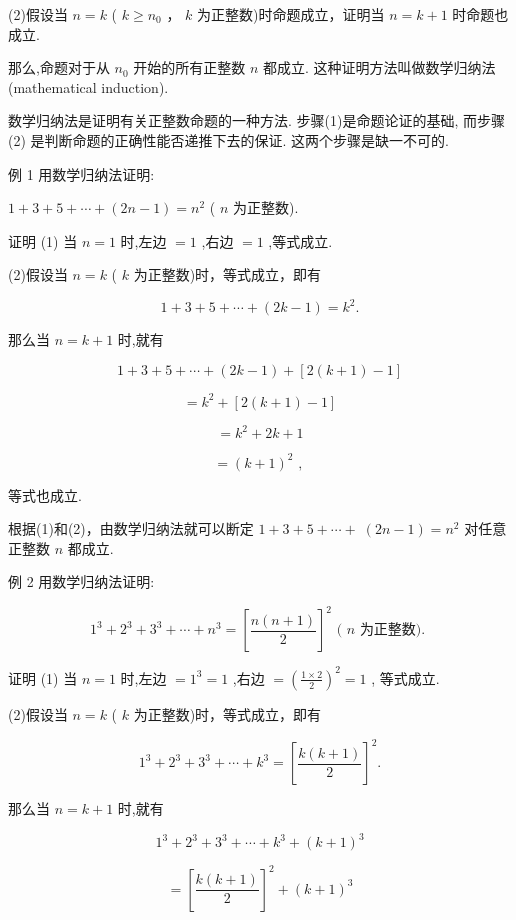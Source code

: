 \documentclass[10pt]{article}
\begin{document}
(2)假设当 \(n = k\) ( \(k \geq  {n}_{0}\) ， \(k\) 为正整数)时命题成立，证明当 \(n = k + 1\) 时命题也成立.

那么,命题对于从 \({n}_{0}\) 开始的所有正整数 \(n\) 都成立. 这种证明方法叫做数学归纳法 (mathematical induction).

数学归纳法是证明有关正整数命题的一种方法. 步骤(1)是命题论证的基础, 而步骤 (2) 是判断命题的正确性能否递推下去的保证. 这两个步骤是缺一不可的.

例 1 用数学归纳法证明:

\(1 + 3 + 5 + \cdots  + \left( {{2n} - 1}\right)  = {n}^{2}\) ( \(n\) 为正整数).

证明 (1) 当 \(n = 1\) 时,左边 \(= 1\) ,右边 \(= 1\) ,等式成立.

(2)假设当 \(n = k\) ( \(k\) 为正整数)时，等式成立，即有

\[
1 + 3 + 5 + \cdots  + \left( {{2k} - 1}\right)  = {k}^{2}.
\]

那么当 \(n = k + 1\) 时,就有

\[
1 + 3 + 5 + \cdots  + \left( {{2k} - 1}\right)  + \left\lbrack  {2\left( {k + 1}\right)  - 1}\right\rbrack
\]

\[
= {k}^{2} + \left\lbrack  {2\left( {k + 1}\right)  - 1}\right\rbrack
\]

\[
= {k}^{2} + {2k} + 1
\]

\[
= {\left( k + 1\right) }^{2}\text{ , }
\]

等式也成立.

根据(1)和(2)，由数学归纳法就可以断定 \(1 + 3 + 5 + \cdots  + \; \left( {{2n} - 1}\right)  = {n}^{2}\) 对任意正整数 \(n\) 都成立.

例 2 用数学归纳法证明:

\[
{1}^{3} + {2}^{3} + {3}^{3} + \cdots  + {n}^{3} = {\left\lbrack  \frac{n\left( {n + 1}\right) }{2}\right\rbrack  }^{2}\text{ ( }n\text{ 为正整数). }
\]

证明 (1) 当 \(n = 1\) 时,左边 \(= {1}^{3} = 1\) ,右边 \(= {\left( \frac{1 \times  2}{2}\right) }^{2} = 1\) , 等式成立.

(2)假设当 \(n = k\) ( \(k\) 为正整数)时，等式成立，即有

\[
{1}^{3} + {2}^{3} + {3}^{3} + \cdots  + {k}^{3} = {\left\lbrack  \frac{k\left( {k + 1}\right) }{2}\right\rbrack  }^{2}.
\]

那么当 \(n = k + 1\) 时,就有

\[
{1}^{3} + {2}^{3} + {3}^{3} + \cdots  + {k}^{3} + {\left( k + 1\right) }^{3}
\]

\[
= {\left\lbrack  \frac{k\left( {k + 1}\right) }{2}\right\rbrack  }^{2} + {\left( k + 1\right) }^{3}
\]
\end{document}
